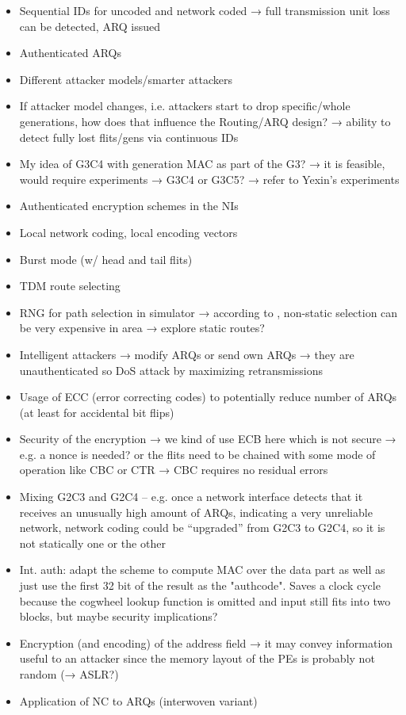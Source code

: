 \begin{itemize}
    \item Sequential IDs for uncoded and network coded → full transmission unit loss can be detected, ARQ issued
    \item Authenticated ARQs
    \item Different attacker models/smarter attackers
    \item If attacker model changes, i.e. attackers start to drop specific/whole generations,
        how does that influence the Routing/ARQ design? → ability to detect fully lost flits/gens via continuous IDs
    \item My idea of G3C4 with generation MAC as part of the G3? → it is feasible, would require experiments → G3C4 or G3C5? → refer to Yexin's
        experiments
    \item Authenticated encryption schemes in the NIs
    \item Local network coding, local encoding vectors
    \item Burst mode (w/ head and tail flits)
    \item TDM route selecting
    \item RNG for path selection in simulator → according to \cite{stefan11enhancingnocs}, non-static selection can be very expensive in area →
        explore static routes?
    \item Intelligent attackers → modify ARQs or send own ARQs → they are unauthenticated so DoS attack by maximizing retransmissions
    \item Usage of ECC (error correcting codes) to potentially reduce number of ARQs (at least for accidental bit flips)
    \item Security of the encryption → we kind of use ECB here which is not secure → e.g. a nonce is needed? or the flits need to be chained with some
        mode of operation like CBC or CTR → CBC requires no residual errors
    \item Mixing G2C3 and G2C4 -- e.g. once a network interface detects that it receives an unusually high amount of ARQs, indicating a very
        unreliable network, network coding could be \enquote{upgraded} from G2C3 to G2C4, so it is not statically one or the other
    \item Int. auth: adapt the scheme to compute MAC over the data part as well as just use the first 32 bit of the result as the "authcode". Saves a
        clock cycle because the cogwheel lookup function is omitted and input still fits into two blocks, but maybe security implications?
    \item Encryption (and encoding) of the address field → it may convey information useful to an attacker since the memory layout of the PEs is probably not random
        (→ ASLR?)
    \item Application of NC to ARQs (interwoven variant)
\end{itemize}
